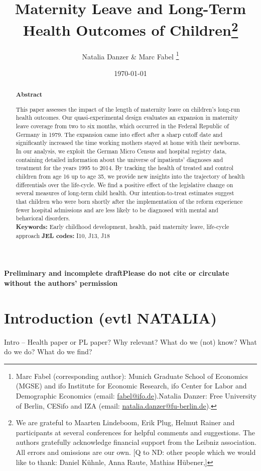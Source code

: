 \documentclass[11pt, a4paper]{article} %
\title{Maternity Leave and Long-Term Health Outcomes of Children\footnote{We are grateful to Maarten Lindeboom, Erik Plug, Helmut Rainer and participants at several conferences for helpful comments and suggestions. The authors gratefully acknowledge financial support from the Leibniz association. All errors and omissions are our own.
[Q to ND:  other people which we would like to thank: Daniel Kühnle, Anna Raute, Mathias Hübener,]}}
\author{Natalia Danzer \& Marc Fabel \thanks{Marc Fabel (corresponding author): Munich Graduate School of Economics (MGSE) and ifo Institute for Economic Research, ifo Center for Labor and Demographic Economics (email: \href{mailto:fabel@ifo.de}{fabel@ifo.de}).\newline Natalia Danzer: Free University of Berlin, CESifo and IZA (email: \href{mailto:natalia.danzer@fu-berlin.de}{natalia.danzer@fu-berlin.de}).}}
\date{\monthyeardate\today}
\begin{document}
\setcounter{page}{0}  
\tableofcontents
\newpage
\setcounter{page}{1}    
\maketitle

\textbf{\color{red} Preliminary and incomplete draft\newline Please do not cite or circulate without the authors' permission}
\renewcommand{\abstractname}{\vspace{-\baselineskip}} %

  \begin{abstract}\noindent 
   \footnotesize{\begin{center}\textbf{Abstract}\end{center} This paper assesses the impact of the length of maternity leave on children’s long-run health outcomes. Our quasi-experimental design evaluates an expansion in maternity leave coverage from two to six months, which occurred in the Federal Republic of Germany in 1979. The expansion came into effect after a sharp cutoff date and significantly increased the time working mothers stayed at home with their newborns. In our analysis, we exploit the German Micro Census and hospital registry data, containing detailed information about the universe of inpatients' diagnoses and treatment for the years 1995 to 2014. By tracking the health of treated and control children from age 16 up to age 35, we provide new insights into the trajectory of health differentials over the life-cycle.
   	We find a positive effect of the legislative change on several measures of long-term child health. Our intention-to-treat estimates suggest that children who were born shortly after the implementation of the reform experience fewer hospital admissions and are less likely to be diagnosed with mental and behavioral disorders.\\\newline \textbf{Keywords:} Early childhood development, health, paid maternity leave, life-cycle approach \newline \textbf{JEL codes:} I10, J13, J18}
    \end{abstract}

\newpage


\section{Introduction (evtl NATALIA)}\label{sec:introduction}
Intro –
Health paper or PL paper?
Why relevant?
What do we (not) know?
What do we do?
What do we find?
 
\end{document}

